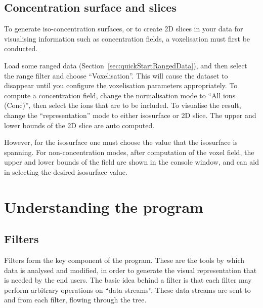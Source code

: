 \documentclass[10pt]{article}
\begin{document}
\subsection{Concentration surface and slices}

To generate iso-concentration surfaces, or to create 2D slices in your data for visualising information such as concentration fields, a voxelisation must first be conducted.

Load some ranged data (Section~\ref{sec:quickStartRangedData}), and then select the range filter and choose ``Voxelisation''. This will cause the dataset to disappear until you configure the voxelisation parameters appropriately. To compute a concentration field, change the normalisation mode to ``All ions (Conc)'', then select the ions that are to be included.  To visualise the result, change the ``representation'' mode to either isosurface or 2D slice. The upper and lower bounds of the 2D slice are auto computed. 

However, for the isosurface one must choose the value that the isosurface is spanning. For non-concentration modes, after computation of the voxel field, the upper and lower bounds of the field are shown in the console window, and can aid in selecting the desired isosurface value.

\FloatBarrier

\section{Understanding the program}
\subsection{Filters}

Filters form the key component of the program. These are the tools by which data is analysed and modified, in order to generate the visual representation that is needed by the end users. The basic idea behind a filter is that each filter may perform arbitrary operations on ``data streams''. These data streams are sent to and from each filter, flowing through the tree.
\end{document}

